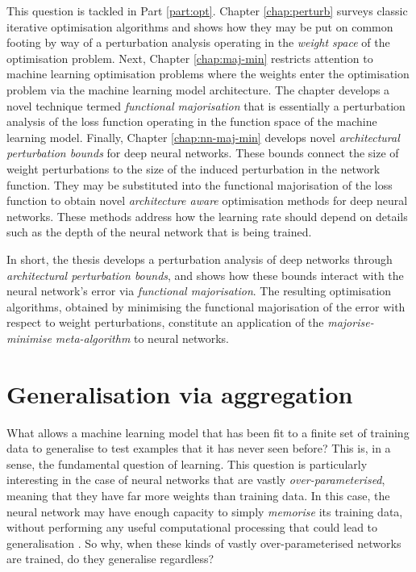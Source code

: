 \begin{refsection}
This question is tackled in Part \ref{part:opt}. Chapter \ref{chap:perturb} surveys classic iterative optimisation algorithms and shows how they may be put on common footing by way of a perturbation analysis operating in the \textit{weight space} of the optimisation problem. Next, Chapter \ref{chap:maj-min} restricts attention to machine learning optimisation problems where the weights enter the optimisation problem via the machine learning model architecture. The chapter develops a novel technique termed \textit{functional majorisation} that is essentially a perturbation analysis of the loss function operating in the function space of the machine learning model. Finally, Chapter \ref{chap:nn-maj-min} develops novel \textit{architectural perturbation bounds} for deep neural networks. These bounds connect the size of weight perturbations to the size of the induced perturbation in the network function. They may be substituted into the functional majorisation of the loss function to obtain novel \textit{architecture aware} optimisation methods for deep neural networks. These methods address how the learning rate should depend on details such as the depth of the neural network that is being trained.

In short, the thesis develops a perturbation analysis of deep networks through \textit{architectural perturbation bounds}, and shows how these bounds interact with the neural network's error via \textit{functional majorisation}. The resulting optimisation algorithms, obtained by minimising the functional majorisation of the error with respect to weight perturbations, constitute an application of the \textit{majorise-minimise meta-algorithm} \citep{mm} to neural networks.

\section{Generalisation via aggregation}

What allows a machine learning model that has been fit to a finite set of training data to generalise to test examples that it has never seen before? This is, in a sense, the fundamental question of learning. This question is particularly interesting in the case of neural networks that are vastly \textit{over-parameterised}, meaning that they have far more weights than training data. In this case, the neural network may have enough capacity to simply \textit{memorise} its training data, without performing any useful computational processing that could lead to generalisation \citep{Zhang2017UnderstandingDL}. So why, when these kinds of vastly over-parameterised networks are trained, do they generalise regardless?


\end{refsection}
